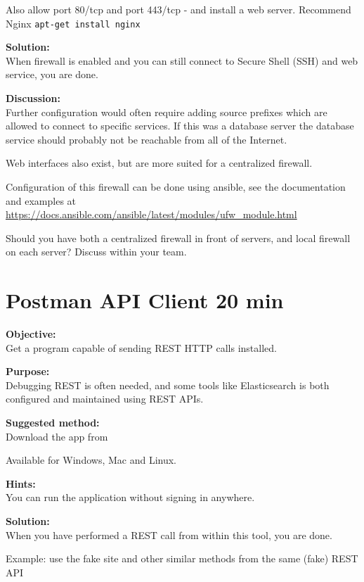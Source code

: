 \documentclass[a4paper,11pt,notitlepage]{report}
\begin{document}
Also allow port 80/tcp and port 443/tcp - and install a web server. Recommend Nginx \verb+apt-get install nginx+

{\bf Solution:}\\
When firewall is enabled and you can still connect to Secure Shell (SSH) and web service, you are done.

{\bf Discussion:}\\
Further configuration would often require adding source prefixes which are allowed to connect to specific services. If this was a database server the database service should probably not be reachable from all of the Internet.

Web interfaces also exist, but are more suited for a centralized firewall.

Configuration of this firewall can be done using ansible, see the documentation and examples at \url{https://docs.ansible.com/ansible/latest/modules/ufw_module.html}

Should you have both a centralized firewall in front of servers, and local firewall on each server? Discuss within your team.




\chapter{Postman API Client 20 min}
\label{ex:postman-api}


{\bf Objective:}\\
Get a program capable of sending REST HTTP calls installed.


{\bf Purpose:}\\
Debugging REST is often needed, and some tools like Elasticsearch is both configured and maintained using REST APIs.

{\bf Suggested method:}\\
Download the app from

Available for Windows, Mac and Linux.

{\bf Hints:}\\
You can run the application without signing in anywhere.

{\bf Solution:}\\
When you have performed a REST call from within this tool, you are done.

Example: use the fake site  and other similar methods from the same (fake) REST API
\end{document}
